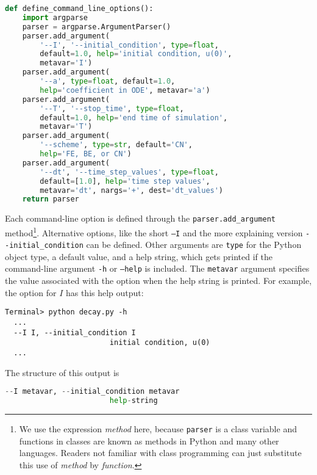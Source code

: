 \documentclass[graybox,sectrefs,envcountresetchap,open=right,final]{svmonodo}
\begin{document}
\begin{lstlisting}[language=python,style=blue1_bluegreen]
def define_command_line_options():
    import argparse
    parser = argparse.ArgumentParser()
    parser.add_argument(
        '--I', '--initial_condition', type=float,
        default=1.0, help='initial condition, u(0)',
        metavar='I')
    parser.add_argument(
        '--a', type=float, default=1.0,
        help='coefficient in ODE', metavar='a')
    parser.add_argument(
        '--T', '--stop_time', type=float,
        default=1.0, help='end time of simulation',
        metavar='T')
    parser.add_argument(
        '--scheme', type=str, default='CN',
        help='FE, BE, or CN')
    parser.add_argument(
        '--dt', '--time_step_values', type=float,
        default=[1.0], help='time step values',
        metavar='dt', nargs='+', dest='dt_values')
    return parser

\end{lstlisting}


Each command-line option is defined through the \Verb!parser.add_argument!
method\footnote{We use the expression \emph{method} here, because \texttt{parser} is a class variable and functions in classes are known as methods in Python and many other languages. Readers not familiar with class programming can just substitute this use of \emph{method} by \emph{function}.}. Alternative options, like the short \texttt{--I} and the more
explaining version \Verb!--initial_condition! can be defined. Other arguments
are \texttt{type} for the Python object type, a default value, and a help
string, which gets printed if the command-line argument \texttt{-h} or \texttt{--help} is
included. The \texttt{metavar} argument specifies the value associated with
the option when the help string is printed. For example, the option for
$I$ has this help output:







\begin{Verbatim}[frame=lines,label=\fbox{{\tiny Terminal}},framesep=2.5mm,framerule=0.7pt,fontsize=\fontsize{9pt}{9pt}]
Terminal> python decay.py -h
  ...
  --I I, --initial_condition I
                        initial condition, u(0)
  ...

\end{Verbatim}

The structure of this output is




\begin{lstlisting}[language=Python,style=gray]
  --I metavar, --initial_condition metavar
                        help-string

\end{lstlisting}
\end{document}
